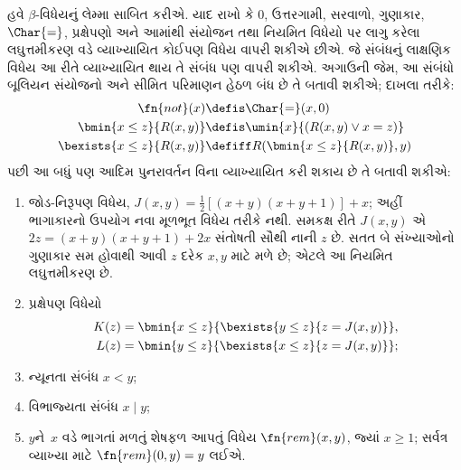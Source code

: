 \documentclass[../../../include/open-logic-section]{subfiles}
\begin{document}
હવે $\beta$-વિધેયનું લેમ્મા સાબિત
કરીએ. યાદ રાખો કે $0$, ઉત્તરગામી,
સરવાળો, ગુણાકાર, $\Char{=}$,
પ્રક્ષેપણો અને આમાંથી સંયોજન તથા
નિયમિત વિધેયો પર લાગુ કરેલા
લઘુત્તમીકરણ વડે વ્યાખ્યાયિત
કોઈપણ વિધેય વાપરી શકીએ છીએ.
જે સંબંધનું લાક્ષણિક વિધેય આ
રીતે વ્યાખ્યાયિત થાય તે સંબંધ પણ
વાપરી શકીએ. અગાઉની જેમ,
આ સંબંધો બૂલિયન સંયોજનો અને
સીમિત પરિમાણન હેઠળ બંધ છે તે
બતાવી શકીએ; દાખલા તરીકે:
\begin{align*}
\fn{not}(x) & \defis \Char{=}(x,0)\\
\bmin{x \leq z}{R(x,y)} & \defis \umin{x}{(R(x,y) \lor x = z)}\\
\bexists{x \leq z}{R(x,y)} & \defiff R(\bmin{x \leq z}{R(x,y)}, y)
\end{align*}
પછી આ બધું પણ આદિમ પુનરાવર્તન
વિના વ્યાખ્યાયિત કરી શકાય છે
તે બતાવી શકીએ:
\begin{enumerate}
\item જોડ-નિરૂપણ વિધેય,
  $J(x,y) = \frac{1}{2}[(x+y)(x+y+1)] + x$;
  અહીં ભાગાકારનો ઉપયોગ નવા મૂળભૂત વિધેય તરીકે નથી.
  સમકક્ષ રીતે $J(x,y)$ એ
  $2z=(x+y)(x+y+1)+2x$ સંતોષતી સૌથી નાની $z$ છે.
  સતત બે સંખ્યાઓનો ગુણાકાર સમ હોવાથી આવી $z$
  દરેક $x,y$ માટે મળે છે; એટલે આ નિયમિત લઘુત્તમીકરણ છે.
\item પ્રક્ષેપણ વિધેયો
\begin{align*}
K(z) & = \bmin{x \leq z}{\bexists{y \leq z}{z = J(x,y)}},\\
L(z) & = \bmin{y \leq z}{\bexists{x \leq z}{z = J(x,y)}};
\end{align*}
\item ન્યૂનતા સંબંધ $x < y$;
\item વિભાજ્યતા સંબંધ $x \mid y$;
\item $y$ને~$x$ વડે ભાગતાં
  મળતું શેષફળ આપતું વિધેય
  $\fn{rem}(x,y)$, જ્યાં $x\geq1$; સર્વત્ર વ્યાખ્યા માટે
  $\fn{rem}(0,y)=y$ લઈએ.
\end{enumerate}
\end{document}
